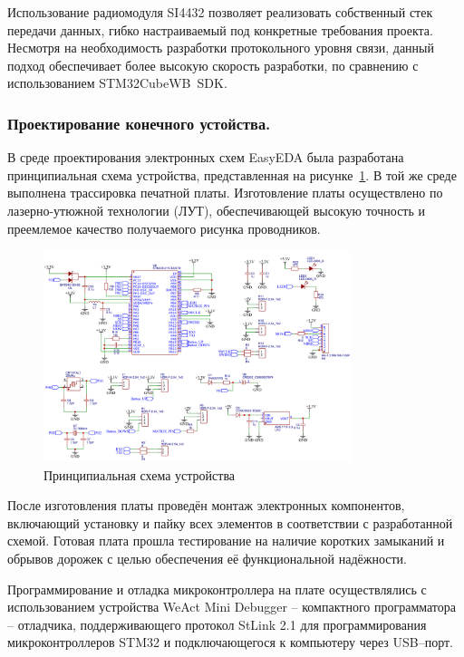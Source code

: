 \documentclass[14pt,a4paper]{extarticle}
\begin{document}
Использование радиомодуля SI4432 позволяет реализовать собственный стек передачи данных, гибко настраиваемый под конкретные требования проекта. Несмотря на необходимость разработки
протокольного уровня связи, данный подход обеспечивает более высокую скорость разработки, по сравнению с использованием STM32CubeWB~SDK.

\subsubsection{Проектирование конечного устойства.}

В среде проектирования электронных схем EasyEDA была разработана принципиальная схема устройства, представленная на рисунке~\ref{fig:STM32_schematic}. В той же среде выполнена
трассировка печатной платы. Изготовление платы осуществлено по лазерно-утюжной технологии (ЛУТ), обеспечивающей высокую точность и преемлемое качество получаемого рисунка проводников.

\begin{figure}[H]
    \centering
    \includegraphics[width=0.8\textwidth]{images/STM32_schematic.png}
    \caption{Принципиальная схема устройства}
    \label{fig:STM32_schematic}
\end{figure}

После изготовления платы проведён монтаж электронных компонентов, включающий установку и пайку всех элементов в соответствии с разработанной схемой. Готовая плата прошла тестирование
на наличие коротких замыканий и обрывов дорожек с целью обеспечения её функциональной надёжности.

Программирование и отладка микроконтроллера на плате осуществлялись с использованием устройства WeAct Mini Debugger -- компактного программатора -- отладчика, поддерживающего протокол
StLink 2.1 для программирования микроконтроллеров STM32 и подключающегося к компьютеру через USB--порт.
\end{document}
